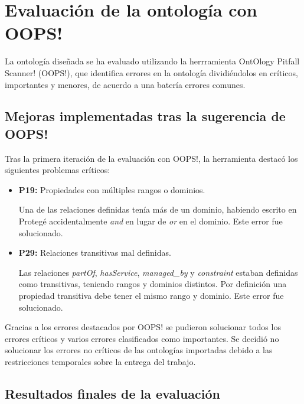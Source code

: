 \documentclass[a4paper,12pt]{article}
\begin{document}
	\section{Evaluación de la ontología con OOPS!}
	La ontología diseñada se ha evaluado utilizando la herrramienta OntOlogy Pitfall Scanner! (OOPS!)\cite{oops}, que identifica errores en la ontología dividiéndolos en críticos, importantes y menores, de acuerdo a una batería errores comunes.
	
	\subsection{Mejoras implementadas tras la sugerencia de OOPS!}
	
	Tras la primera iteración de la evaluación con OOPS!, la herramienta destacó los siguientes problemas críticos:
	
	\begin{itemize}
		\item \textbf{P19:} Propiedades con múltiples rangos o dominios.
		
		Una de las relaciones definidas tenía más de un dominio, habiendo escrito en Protegé accidentalmente \textit{and} en lugar de \textit{or} en el dominio. Este error fue solucionado.
		\item \textbf{P29:} Relaciones transitivas mal definidas.
		
		Las relaciones \textit{partOf}, \textit{hasService}, \textit{managed\_by} y \textit{constraint} estaban definidas como transitivas, teniendo rangos y dominios distintos. Por definición una propiedad transitiva debe tener el mismo rango y dominio. Este error fue solucionado.
	\end{itemize}
	
	Gracias a los errores destacados por OOPS! se pudieron solucionar todos los errores críticos y varios errores clasificados como importantes. Se decidió no solucionar los errores no críticos de las ontologías importadas debido a las restricciones temporales sobre la entrega del trabajo.
	
	\subsection{Resultados finales de la evaluación}
	
\end{document}
